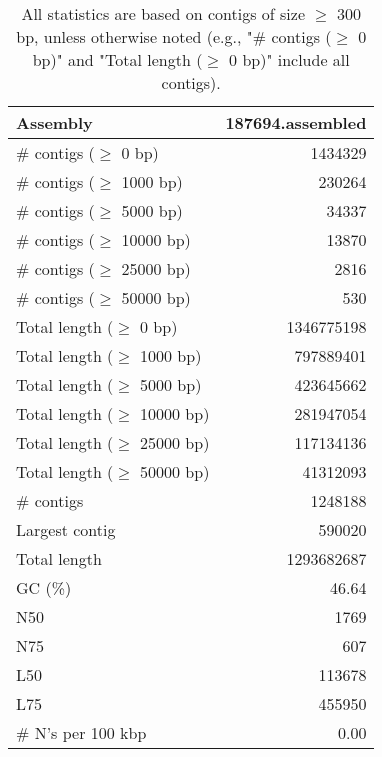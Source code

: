 \documentclass[12pt,a4paper]{article}
\begin{document}
\begin{table}[ht]
\begin{center}
\caption{All statistics are based on contigs of size $\geq$ 300 bp, unless otherwise noted (e.g., "\# contigs ($\geq$ 0 bp)" and "Total length ($\geq$ 0 bp)" include all contigs).}
\begin{tabular}{|l*{1}{|r}|}
\hline
Assembly & 187694.assembled \\ \hline
\# contigs ($\geq$ 0 bp) & 1434329 \\ \hline
\# contigs ($\geq$ 1000 bp) & 230264 \\ \hline
\# contigs ($\geq$ 5000 bp) & 34337 \\ \hline
\# contigs ($\geq$ 10000 bp) & 13870 \\ \hline
\# contigs ($\geq$ 25000 bp) & 2816 \\ \hline
\# contigs ($\geq$ 50000 bp) & 530 \\ \hline
Total length ($\geq$ 0 bp) & 1346775198 \\ \hline
Total length ($\geq$ 1000 bp) & 797889401 \\ \hline
Total length ($\geq$ 5000 bp) & 423645662 \\ \hline
Total length ($\geq$ 10000 bp) & 281947054 \\ \hline
Total length ($\geq$ 25000 bp) & 117134136 \\ \hline
Total length ($\geq$ 50000 bp) & 41312093 \\ \hline
\# contigs & 1248188 \\ \hline
Largest contig & 590020 \\ \hline
Total length & 1293682687 \\ \hline
GC (\%) & 46.64 \\ \hline
N50 & 1769 \\ \hline
N75 & 607 \\ \hline
L50 & 113678 \\ \hline
L75 & 455950 \\ \hline
\# N's per 100 kbp & 0.00 \\ \hline
\end{tabular}
\end{center}
\end{table}
\end{document}
